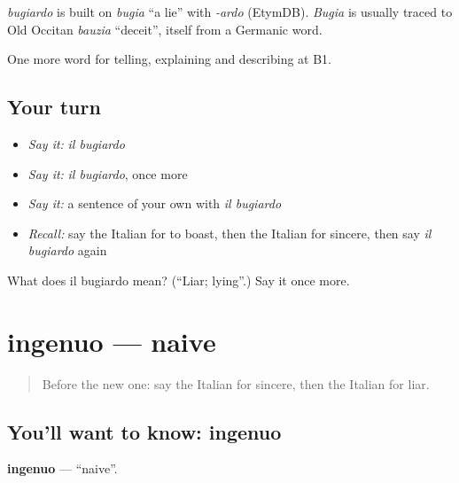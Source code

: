 \begin{cousinweb}
\emph{bugiardo} is built on \emph{bugia} \textquotedblleft{}a lie\textquotedblright{} with \emph{-ardo} (EtymDB). \emph{Bugia} is usually traced to Old Occitan \emph{bauzia} \textquotedblleft{}deceit\textquotedblright{}, itself from a Germanic word.
\end{cousinweb}

\begin{grammarlens}[title={What you've built}]
One more word for telling, explaining and describing at B1.
\end{grammarlens}

\subsection*{Your turn}
\begin{itemize}
\raggedright
  \item \emph{Say it:} \emph{il bugiardo}
  \item \emph{Say it:} \emph{il bugiardo}, once more
  \item \emph{Say it:} a sentence of your own with \emph{il bugiardo}
  \item \emph{Recall:} say the Italian for to boast, then the Italian for sincere, then say \emph{il bugiardo} again
\end{itemize}

\begin{tcolorbox}[breakable,colback=teal!4,colframe=teal!35!black,title={Before you move on}]
What does il bugiardo mean? (\textquotedblleft{}Liar; lying\textquotedblright{}.) Say it once more.
\end{tcolorbox}
\section[ingenuo]{ingenuo — naive}

\label{lesson:IT-C473-ingenuo}



\begin{quote}
Before the new one: say the Italian for sincere, then the Italian for liar.
\end{quote}

\subsection*{You'll want to know: ingenuo}
\textbf{ingenuo} — \textquotedblleft{}naive\textquotedblright{}.

